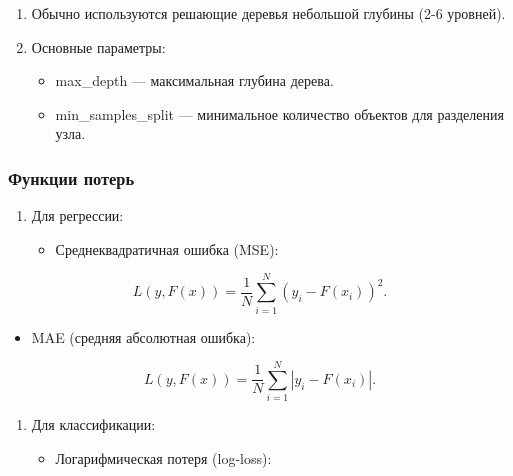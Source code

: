 \begin{enumerate}
\begin{enumerate}
\def\labelenumi{\arabic{enumi}.}
\tightlist
\item
  Обычно используются решающие деревья небольшой глубины (2-6 уровней).
\item
  Основные параметры:

  \begin{itemize}
  \tightlist
  \item
    max\_depth --- максимальная глубина дерева.
  \item
    min\_samples\_split --- минимальное количество объектов для
    разделения узла.
  \end{itemize}
\end{enumerate}

\hypertarget{ux444ux443ux43dux43aux446ux438ux438-ux43fux43eux442ux435ux440ux44c}{%
\subsubsection*{Функции
потерь}\label{ux444ux443ux43dux43aux446ux438ux438-ux43fux43eux442ux435ux440ux44c}}

\begin{enumerate}
\def\labelenumi{\arabic{enumi}.}
\tightlist
\item
  Для регрессии:

  \begin{itemize}
  \tightlist
  \item
    Среднеквадратичная ошибка (MSE):
  \end{itemize}
\end{enumerate}

\begin{equation}
     L(y, F(x)) = \frac{1}{N} \sum_{i=1}^N (y_i - F(x_i))^2.
\end{equation}

\begin{itemize}
\tightlist
\item
  MAE (средняя абсолютная ошибка):
\end{itemize}

\begin{equation}
     L(y, F(x)) = \frac{1}{N} \sum_{i=1}^N |y_i - F(x_i)|.
\end{equation}

\begin{enumerate}
\def\labelenumi{\arabic{enumi}.}
\setcounter{enumi}{1}
\tightlist
\item
  Для классификации:

  \begin{itemize}
  \tightlist
  \item
    Логарифмическая потеря (log-loss):
  \end{itemize}
\end{enumerate}


\end{enumerate}
